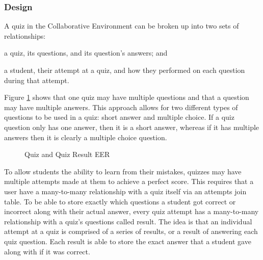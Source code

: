 \subsubsection{Design}
A quiz in the Collaborative Environment can be broken up into two sets of relationships:
\begin{inparaenum}[\itshape 1\upshape)]
	\item a quiz, its questions, and its question's answers; and
	\item a student, their attempt at a quiz, and how they performed on each question during that attempt.
\end{inparaenum}
Figure \ref{fig:er-quiz} shows that one quiz may have multiple questions and that a question may have multiple answers. This approach allows for two different types of questions to be used in a quiz: short answer and multiple choice. If a quiz question only has one answer, then it is a short answer, whereas if it has multiple answers then it is clearly a multiple choice question.

\begin{figure}[h!]
	\centering
	\caption{Quiz and Quiz Result EER}
	\label{fig:er-quiz}
\end{figure}

To allow students the ability to learn from their mistakes, quizzes may have multiple attempts made at them to achieve a perfect score. This requires that a user have a many-to-many relationship with a quiz itself via an attempts join table. To be able to store exactly which questions a student got correct or incorrect along with their actual answer, every quiz attempt has a many-to-many relationship with a quiz's questions called result. The idea is that an individual attempt at a quiz is comprised of a series of results, or a result of answering each quiz question. Each result is able to store the exact answer that a student gave along with if it was correct.

